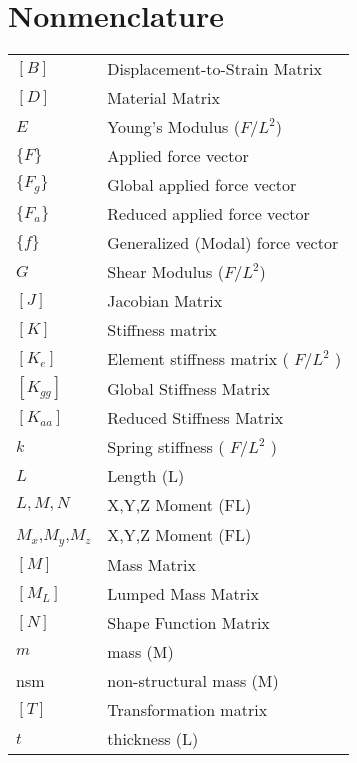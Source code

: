 \section{Nonmenclature}

\begin{tabular}{ll}
    $[B]$      & Displacement-to-Strain Matrix        \\
    $[D]$      & Material Matrix                      \\
    $E$        & Young's Modulus ($F/L^2$)            \\
    $\{F\}$    & Applied force vector                 \\
    $\{F_g\}$  & Global  applied force vector         \\
    $\{F_a\}$  & Reduced applied force vector         \\
    $\{f\}$    & Generalized (Modal) force vector     \\
    $G$        & Shear Modulus ($F/L^2$)              \\
    $[J]$      & Jacobian Matrix                      \\
    $[K]$      & Stiffness matrix                     \\
    $[K_e]$    & Element stiffness matrix ( $ F/ L^2$ ) \\
    $[K_{gg}]$ & Global  Stiffness Matrix             \\
    $[K_{aa}]$ & Reduced Stiffness Matrix             \\
    $k$        & Spring stiffness ( $ F/L^2$ )        \\
    $L$        & Length (L)                           \\
    $L,M,N$    & X,Y,Z Moment (FL)                    \\
    $M_x$,$M_y$,$M_z$    & X,Y,Z Moment (FL)           \\
    $[M]$      & Mass Matrix                          \\
    $[M_L]$    & Lumped Mass Matrix                   \\
    $[N]$      & Shape Function Matrix                \\
    $m$        & mass (M)                             \\
    nsm        & non-structural mass (M)              \\
    $[T]$      & Transformation matrix                \\
    $t$        & thickness (L)                        \\

\end{tabular}
